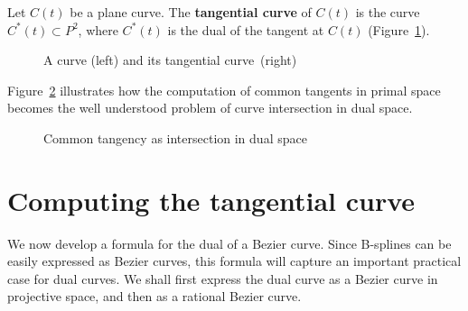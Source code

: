 \documentclass[11pt]{article}
\newif\ifVideo
\newif\ifTalk
\newcommand{\tang}{tangential curve\ }
\begin{document}
\begin{defn2}
Let $C(t)$ be a plane curve.
The {\bf tangential curve} of $C(t)$ is the curve $C^*(t) \subset P^2$,
where $C^*(t)$ is the dual of the tangent at $C(t)$ (Figure~\ref{fig:1dual}).
\end{defn2}
%
\begin{figure}
\vspace{2.5in}
\caption{A curve (left) and its \tang (right)}
\label{fig:1dual}
\end{figure}
\ifVideo
  video: single curve and its dual (ob2.rawctr)
       tangent moving on curve with associated point moving on dual
\fi
%
Figure~\ref{fig:commonTang} illustrates how the computation of 
common tangents in primal space becomes the well understood problem
of curve intersection in dual space.
%
\ifTalk
This is analogous to the appeal
of using the Fourier transform to shift to the frequency domain,
where the difficult operation of convolution 
becomes the simple operation of multiplication.
\fi
%
\begin{figure}
\vspace{2.5in}
\caption{Common tangency as intersection in dual space}
\label{fig:commonTang}
\end{figure}
%

\clearpage

\section{Computing the \tang}
\label{sec:Bezier}

We now develop a formula for the dual of a Bezier curve.
Since B-splines can be easily expressed as Bezier curves, 
this formula will capture an important practical case for dual curves.
We shall first express the dual curve as a Bezier curve in
projective space, and then as a rational Bezier curve.
\end{document}
